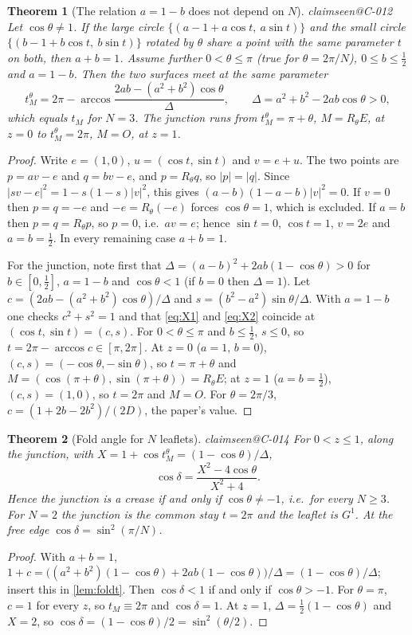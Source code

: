 \documentclass[11pt,a4paper]{article}
\makeatletter
\theoremstyle{plain}
\newtheorem{theorem}{Theorem}[section]
\theoremstyle{remark}
\newcommand{\claim}[1]{\ifcsname claimseen@#1\endcsname\else\expandafter\gdef\csname claimseen@#1\endcsname{}\label{claim:#1}\fi}
\makeatother
\begin{document}
\begin{theorem}[The relation $a=1-b$ does not depend on $N$]\label{thm:aplusb}\claim{C-012}
Let $\cos\theta\ne1$. If the large circle $\{(a-1+a\cos t,\ a\sin t)\}$ and the small circle
$\{(b-1+b\cos t,\ b\sin t)\}$ rotated by $\theta$ share a point with the same parameter $t$ on both, then $a+b=1$. Assume
further $0<\theta\le\pi$ (true for $\theta=2\pi/N$), $0\le b\le\frac12$ and $a=1-b$. Then the two surfaces meet at the same parameter
\[ t_M^\theta=2\pi-\arccos\frac{2ab-(a^2+b^2)\cos\theta}{\Delta},\qquad \Delta=a^2+b^2-2ab\cos\theta>0, \]
which equals $t_M$ for $N=3$. The junction runs from $t_M^\theta=\pi+\theta$, $M=R_\theta E$, at $z=0$ to $t_M^\theta=2\pi$, $M=O$, at $z=1$.
\end{theorem}
\begin{proof}
Write $e=(1,0)$, $u=(\cos t,\sin t)$ and $v=e+u$. The two points are $p=av-e$ and $q=bv-e$, and $p=R_\theta q$, so
$|p|=|q|$. Since $|sv-e|^2=1-s(1-s)|v|^2$, this gives $(a-b)(1-a-b)|v|^2=0$. If $v=0$ then $p=q=-e$ and $-e=R_\theta(-e)$
forces $\cos\theta=1$, which is excluded. If $a=b$ then $p=q=R_\theta p$, so $p=0$, i.e.\ $av=e$; hence $\sin t=0$,
$\cos t=1$, $v=2e$ and $a=b=\frac12$. In every remaining case $a+b=1$.

For the junction, note first that $\Delta=(a-b)^2+2ab(1-\cos\theta)>0$ for $b\in[0,\frac12]$, $a=1-b$ and
$\cos\theta<1$ (if $b=0$ then $\Delta=1$). Let $c=(2ab-(a^2+b^2)\cos\theta)/\Delta$ and $s=(b^2-a^2)\sin\theta/\Delta$. With $a=1-b$ one checks
$c^2+s^2=1$ and that \eqref{eq:X1} and \eqref{eq:X2} coincide at $(\cos t,\sin t)=(c,s)$. For $0<\theta\le\pi$ and
$b\le\frac12$, $s\le0$, so $t=2\pi-\arccos c\in[\pi,2\pi]$. At $z=0$ ($a=1$, $b=0$), $(c,s)=(-\cos\theta,-\sin\theta)$, so
$t=\pi+\theta$ and $M=(\cos(\pi+\theta),\sin(\pi+\theta))=R_\theta E$; at $z=1$ ($a=b=\frac12$), $(c,s)=(1,0)$, so $t=2\pi$ and
$M=O$. For $\theta=2\pi/3$, $c=(1+2b-2b^2)/(2D)$, the paper's value.
\end{proof}

\begin{theorem}[Fold angle for $N$ leaflets]\label{thm:foldN}\claim{C-014}
For $0<z\le1$, along the junction, with $X=1+\cos t_M^\theta=(1-\cos\theta)/\Delta$,
\[ \cos\delta=\frac{X^2-4\cos\theta}{X^2+4}. \]
Hence the junction is a crease if and only if $\cos\theta\ne-1$, i.e.\ for every $N\ge3$. For $N=2$ the junction is the
common stay $t=2\pi$ and the leaflet is $G^1$. At the free edge $\cos\delta=\sin^2(\pi/N)$.
\end{theorem}
\begin{proof}
With $a+b=1$, $1+c=\big((a^2+b^2)(1-\cos\theta)+2ab(1-\cos\theta)\big)/\Delta=(1-\cos\theta)/\Delta$; insert this in
\cref{lem:foldt}. Then $\cos\delta<1$ if and only if $\cos\theta>-1$. For $\theta=\pi$, $c=1$ for every $z$, so
$t_M\equiv2\pi$ and $\cos\delta=1$. At $z=1$, $\Delta=\frac12(1-\cos\theta)$ and $X=2$, so
$\cos\delta=(1-\cos\theta)/2=\sin^2(\theta/2)$.
\end{proof}
\end{document}
